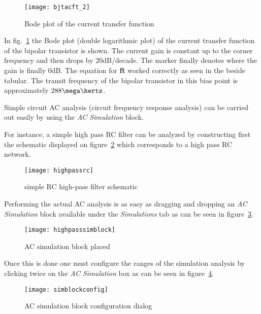 \begin{figure}[ht]
  \centering
  \texttt{[image: bjtacft\_2]}
  \caption{Bode plot of the current transfer function}
  \label{fig:bjtacft_2}
\end{figure}
\FloatBarrier

In fig.~\ref{fig:bjtacft_2} the Bode plot (double logarithmic plot) of
the current transfer function of the bipolar transistor is shown.  The
current gain is constant up to the corner frequency and then drops by
20dB/decade.  The marker finally denotes where the gain is finally
0dB.  The equation for \textbf{ft} worked correctly as seen in the
beside tabular.  The transit frequency of the bipolar transistor in
this bias point is approximately $288\mega\hertz$.


Simple circuit AC analysis (circuit frequency response analysis) can
be carried out easily by using the \emph{AC Simulation} block.

\addvspace{12pt}

For instance, a simple high pass RC filter can be analyzed by
constructing first the schematic displayed on
figure~\ref{fig:highpassrc} which corresponds to a high pass RC
network.

\begin{figure}[ht]
  \centering
  \texttt{[image: highpassrc]}
  \caption{simple RC high-pass filter schematic}
  \label{fig:highpassrc}
\end{figure}
\FloatBarrier

Performing the actual AC analysis is as easy as dragging and dropping an
\emph{AC Simulation} block available under the \emph{Simulations}
tab as can be seen in figure~\ref{fig:highpassimblock}. 

\begin{figure}[ht]
  \centering
  \texttt{[image: highpasssimblock]}
  \caption{AC simulation block placed}
  \label{fig:highpassimblock}
\end{figure}
\FloatBarrier

Once this is done one must configure the ranges of the simulation
analysis by clicking twice on the \emph{AC Simulation} box as can be
seen in figure~\ref{fig:simblockconfig}.

\begin{figure}[ht]
  \centering
  \texttt{[image: simblockconfig]}
  \caption{AC simulation block configuration dialog}
  \label{fig:simblockconfig}
\end{figure}
\FloatBarrier

